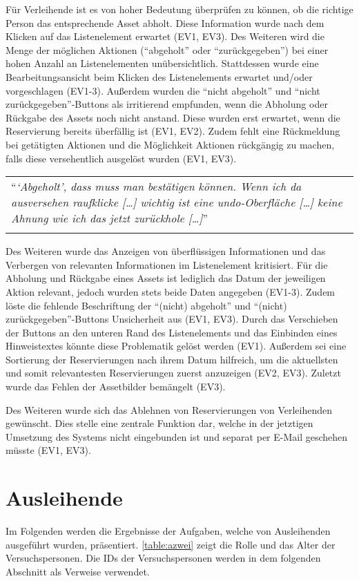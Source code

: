 Für Verleihende ist es von hoher Bedeutung überprüfen zu können, ob die richtige Person das
entsprechende Asset abholt. Diese Information wurde nach dem Klicken auf das Listenelement erwartet
(EV1, EV3). Des Weiteren wird die Menge der möglichen Aktionen (\enquote{abgeholt} oder
\enquote{zurückgegeben}) bei einer hohen Anzahl an Listenelementen unübersichtlich. Stattdessen
wurde eine Bearbeitungsansicht beim Klicken des Listenelements erwartet und/oder vorgeschlagen
(EV1-3). Außerdem wurden die \enquote{nicht abgeholt} und \enquote{nicht zurückgegeben}-Buttons als
irritierend empfunden, wenn die Abholung oder Rückgabe des Assets noch nicht anstand. Diese wurden
erst erwartet, wenn die Reservierung bereits überfällig ist (EV1, EV2). Zudem fehlt eine Rückmeldung
bei getätigten Aktionen und die Möglichkeit Aktionen rückgängig zu machen, falls diese versehentlich
ausgelöst wurden (EV1, EV3). 

\begin{longtable}{p{}} \arrayrulecolor{maincolor}\hline
  \enquote{\textit{\enquote{Abgeholt}, dass muss man bestätigen können. Wenn ich
  da ausversehen raufklicke [\dots] wichtig ist eine undo-Oberfläche [\dots]
  keine Ahnung wie ich das jetzt zurückhole [\dots]}} \\
  \arrayrulecolor{maincolor}\hline
\end{longtable}

Des Weiteren wurde das Anzeigen von überflüssigen Informationen und das Verbergen von relevanten
Informationen im Listenelement kritisiert. Für die Abholung und Rückgabe eines Assets ist lediglich
das Datum der jeweiligen Aktion relevant, jedoch wurden stets beide Daten angegeben (EV1-3). Zudem
löste die fehlende Beschriftung der \enquote{(nicht) abgeholt} und \enquote{(nicht)
zurückgegeben}-Buttons Unsicherheit aus (EV1, EV3). Durch das Verschieben der Buttons an den unteren
Rand des Listenelements und das Einbinden eines Hinweistextes könnte diese Problematik gelöst
werden (EV1). Außerdem sei eine Sortierung der Reservierungen nach ihrem Datum hilfreich, um die
aktuellsten und somit relevantesten Reservierungen zuerst anzuzeigen (EV2, EV3). Zuletzt wurde das Fehlen
der Assetbilder bemängelt (EV3). 

Des Weiteren wurde sich das Ablehnen von Reservierungen von Verleihenden gewünscht. Dies stelle
eine zentrale Funktion dar, welche in der jetztigen Umsetzung des Systems nicht eingebunden ist und
separat per E-Mail geschehen müsste (EV1, EV3).

\section{Ausleihende}
Im Folgenden werden die Ergebnisse der Aufgaben, welche von Ausleihenden ausgeführt wurden,
präsentiert. \ref{table:azwei} zeigt die Rolle und das Alter der Versuchspersonen. Die IDs der
Versuchspersonen werden in dem folgenden Abschnitt als Verweise verwendet.

